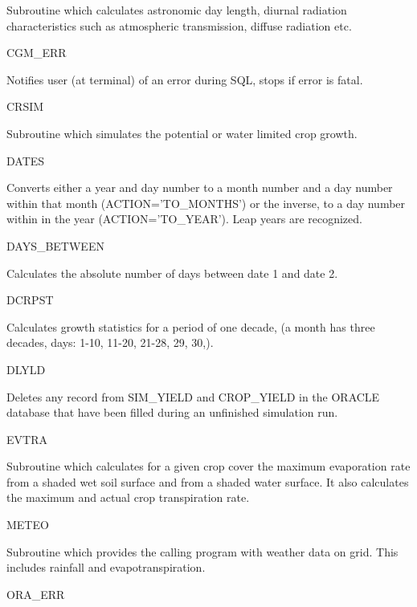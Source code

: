 \documentclass[11pt]{article}
\begin{document}
\begin{indenting}{5.08cm}
Subroutine which calculates astronomic day length, diurnal
radia\-tion characteristics such as atmospheric transmission,
diffuse radiation etc.
\end{indenting}
CGM\_ERR
\testlastline

\begin{indenting}{5.08cm}
Notifies user (at terminal) of an error during SQL, stops if
error is fatal.
\end{indenting}
CRSIM
\testlastline

\begin{indenting}{5.08cm}
Subroutine which simulates the potential or water limited
crop growth.
\end{indenting}
DATES
\testlastline

\begin{indenting}{5.08cm}
Converts either a year and day number to a month num\-ber
and a day number within that month (ACTI\-ON='TO\-{\nobreak}\_MONTHS') or the inverse, to a day number within in the
year (ACTI\-{\nobreak}ON='TO\_YEAR'). Leap years are recognized.
\end{indenting}
DAYS\_BETWEEN
\testlastline

\begin{indenting}{5.08cm}
Calculates the absolute number of days between date 1 and
date 2.
\end{indenting}
DCRPST
\testlastline

\begin{indenting}{5.08cm}
Calculates growth statistics for a period of one decade, (a
month has three decades, days: 1-10, 11-20, 21-28, 29, 30,).
\end{indenting}
DLYLD
\testlastline

\begin{indenting}{5.08cm}
Deletes any record from SIM\_YIELD and CROP\_YIELD in
the ORACLE database that have been filled during an unfin\-ished simulati\-on run.
\end{indenting}
EVTRA
\testlastline

\begin{indenting}{5.08cm}
Subroutine which calculates for a given crop cover the maxi\-mum evaporation rate  from a shaded wet soil surfa\-ce and
from a shaded water surface. It also calculates the maximum
and actual crop transpiration rate.
\end{indenting}
METEO
\testlastline

\begin{indenting}{5.08cm}
Subroutine which provides the calling program with weat\-her
data on grid. This includes rainfall and evapotranspi\-ra\-tion.
\end{indenting}
ORA\_ERR
\testlastline
\end{document}
